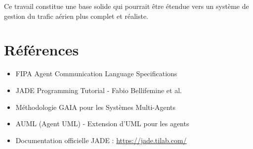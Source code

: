 \documentclass[12pt,a4paper]{article}
\begin{document}
Ce travail constitue une base solide qui pourrait être étendue vers un système de gestion du trafic aérien plus complet et réaliste.

\section*{Références}

\begin{itemize}
    \item FIPA Agent Communication Language Specifications
    \item JADE Programming Tutorial - Fabio Bellifemine et al.
    \item Méthodologie GAIA pour les Systèmes Multi-Agents
    \item AUML (Agent UML) - Extension d'UML pour les agents
    \item Documentation officielle JADE : \url{https://jade.tilab.com/}
\end{itemize}
\end{document}
